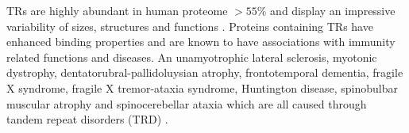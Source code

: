\documentclass[a4,center,fleqn]{NAR}
\begin{document}
TRs are highly abundant in human proteome $>55\%$ \cite{Rollins2005} and display an impressive variability of sizes, structures and functions \cite{Schaper2012, Schaper2014}. 
Proteins containing TRs have enhanced binding properties \cite{Li2003} and are known to have associations with immunity related functions \cite{Usdin2008, Madsen2008} and diseases.
An unamyotrophic lateral sclerosis, myotonic dystrophy, dentatorubral-pallidoluysian atrophy, frontotemporal dementia, fragile X syndrome, fragile X tremor-ataxia syndrome, Huntington disease, spinobulbar muscular atrophy and spinocerebellar ataxia which are all caused through tandem repeat disorders (TRD) \cite{Hannan2018}. \\
\enlargethispage{-65.1pt}
\end{document}

